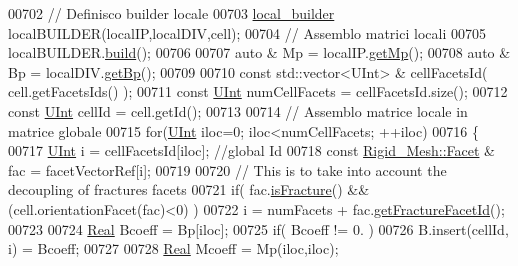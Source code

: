 \begin{DoxyCode}
00702                 \textcolor{comment}{// Definisco builder locale}
00703                 \hyperlink{classFVCode3D_1_1local__builder}{local\_builder}        localBUILDER(localIP,localDIV,cell);
00704                 \textcolor{comment}{// Assemblo matrici locali}
00705                 localBUILDER.\hyperlink{classFVCode3D_1_1local__builder_a4f57be493ef2a52f37a898855c3e4d66}{build}();
00706                 
00707                 \textcolor{keyword}{auto} & Mp = localIP.\hyperlink{classFVCode3D_1_1local__InnerProduct_a16d585bf2b6ed9f84bab4eff1027b671}{getMp}();
00708                 \textcolor{keyword}{auto} & Bp = localDIV.\hyperlink{classFVCode3D_1_1local__Div_aaed22251b9f77eec2f0ea5321cfb8ad5}{getBp}();
00709                 
00710                 \textcolor{keyword}{const} std::vector<UInt> & cellFacetsId( cell.getFacetsIds() );
00711                 \textcolor{keyword}{const} \hyperlink{namespaceFVCode3D_a4bf7e328c75d0fd504050d040ebe9eda}{UInt} numCellFacets  = cellFacetsId.size();
00712                 \textcolor{keyword}{const} \hyperlink{namespaceFVCode3D_a4bf7e328c75d0fd504050d040ebe9eda}{UInt} cellId         = cell.getId();
00713                 
00714                 \textcolor{comment}{// Assemblo matrice locale in matrice globale}
00715                 \textcolor{keywordflow}{for}(\hyperlink{namespaceFVCode3D_a4bf7e328c75d0fd504050d040ebe9eda}{UInt} iloc=0; iloc<numCellFacets; ++iloc)
00716                 \{       
00717             \hyperlink{namespaceFVCode3D_a4bf7e328c75d0fd504050d040ebe9eda}{UInt} i = cellFacetsId[iloc];                                 \textcolor{comment}{//global Id}
00718             \textcolor{keyword}{const} \hyperlink{classFVCode3D_1_1Rigid__Mesh_1_1Facet}{Rigid\_Mesh::Facet} & fac = facetVectorRef[i];     
00719             
00720             \textcolor{comment}{// This is to take into account the decoupling of fractures facets}
00721                         \textcolor{keywordflow}{if}( fac.\hyperlink{classFVCode3D_1_1Rigid__Mesh_1_1Facet_aed3f579d52847e839501f647e90c35ab}{isFracture}() && (cell.orientationFacet(fac)<0) )
00722                                         i = numFacets + fac.\hyperlink{classFVCode3D_1_1Rigid__Mesh_1_1Facet_a08dc369eccd02b29133187cede7511eb}{getFractureFacetId}();
00723 
00724                 \hyperlink{namespaceFVCode3D_a40c1f5588a248569d80aa5f867080e83}{Real} Bcoeff = Bp[iloc];
00725             \textcolor{keywordflow}{if}( Bcoeff != 0. )
00726                                 B.insert(cellId, i) = Bcoeff;
00727 
00728             \hyperlink{namespaceFVCode3D_a40c1f5588a248569d80aa5f867080e83}{Real} Mcoeff = Mp(iloc,iloc);

\end{DoxyCode}
